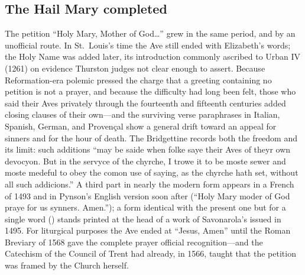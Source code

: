 \subsection{The Hail Mary completed}

The petition ``Holy Mary, Mother of God\ldots'' grew in the same period,
and by an unofficial route. In St.~Louis's time the Ave still ended with
Elizabeth's words; the Holy Name was added later, its introduction
commonly ascribed to Urban IV (1261) on evidence Thurston judges not
clear enough to assert. Because Reformation-era polemic pressed the
charge that a greeting containing no petition is not a prayer, and
because the difficulty had long been felt, those who said their Aves
privately through the fourteenth and fifteenth centuries added closing
clauses of their own---and the surviving verse paraphrases in Italian,
Spanish, German, and Proven\c cal show a general drift toward an appeal
for sinners and for the hour of death. The Bridgettine  records both the freedom and its limit: such additions ``may be
saide when folke saye their Aves of theyr own devocyon. But in the
servyce of the chyrche, I trowe it to be moste sewer and moste medeful
to obey the comon use of saying, as the chyrche hath set, without all
such addicions.'' A third part in nearly the modern form appears in a
French  of 1493 and in Pynson's English
version soon after (``Holy Mary moder of God praye for us synners.
Amen.''); a form identical with the present one but for a single word
() stands printed at the head of a work of Savonarola's
issued in 1495. For liturgical purposes the Ave ended at ``Jesus, Amen''
until the Roman Breviary of 1568 gave the complete prayer official
recognition---and the Catechism of the Council of Trent had already, in
1566, taught that the petition was framed by the Church
herself.

